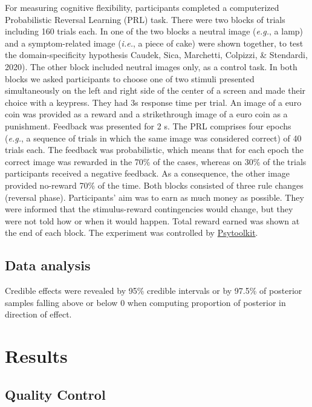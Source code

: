 \documentclass[
  man,floatsintext]{apa6}
\begin{document}
For measuring cognitive flexibility, participants completed a computerized Probabilistic Reversal Learning (PRL) task.
There were two blocks of trials including 160 trials each. In one of the two blocks a neutral image (\emph{e.g.}, a lamp) and a symptom-related image (\emph{i.e.}, a piece of cake) were shown together, to test the domain-specificity hypothesis Caudek, Sica, Marchetti, Colpizzi, \& Stendardi, 2020). The other block included neutral images only, as a control task.
In both blocks we asked participants to choose one of two stimuli presented simultaneously on the left and right side of the center of a screen and made their choice with a keypress. They had 3s response time per trial. An image of a euro coin was provided as a reward and a strikethrough image of a euro coin as a punishment. Feedback was presented for 2 s.
The PRL comprises four epochs (\emph{e.g.}, a sequence of trials in which the same image was considered correct) of 40 trials each.
The feedback was probabilistic, which means that for each epoch the correct image was rewarded in the 70\% of the cases, whereas on 30\% of the trials participants received a negative feedback.
As a consequence, the other image provided no-reward 70\% of the time. Both blocks consisted of three rule changes (reversal phase).
Participants' aim was to earn as much money as possible. They were informed that the stimulus-reward contingencies would change, but they were not told how or when it would happen.
Total reward earned was shown at the end of each block.
The experiment was controlled by \href{https://www.psytoolkit.org/}{Psytoolkit}.

\hypertarget{data-analysis}{%
\subsection{Data analysis}\label{data-analysis}}

Credible effects were revealed by 95\% credible intervals or by 97.5\% of posterior samples falling above or below 0 when computing proportion of posterior in direction of effect.

\hypertarget{results}{%
\section{Results}\label{results}}

\hypertarget{quality-control}{%
\subsection{Quality Control}\label{quality-control}}
\end{document}
